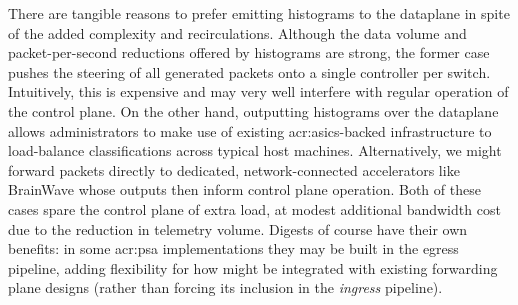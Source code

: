 There are tangible reasons to prefer emitting histograms to the dataplane in spite of the added complexity and recirculations.
Although the data volume and packet-per-second reductions offered by \seidr{} histograms are strong, the former case pushes the steering of all generated packets onto a single controller per switch.
Intuitively, this is expensive and may very well interfere with regular operation of the control plane.
On the other hand, outputting histograms over the dataplane allows administrators to make use of existing \glspl{acr:asic}-backed infrastructure to load-balance classifications across typical host machines.
Alternatively, we might forward packets directly to dedicated, network-connected accelerators like BrainWave whose outputs then inform control plane operation.
Both of these cases spare the control plane of extra load, at modest additional bandwidth cost due to the reduction in telemetry volume.
Digests of course have their own benefits: in some \gls{acr:psa} implementations they may be built in the egress pipeline, adding flexibility for how \seidr{} might be integrated with existing forwarding plane designs (rather than forcing its inclusion in the \emph{ingress} pipeline).

%
%


